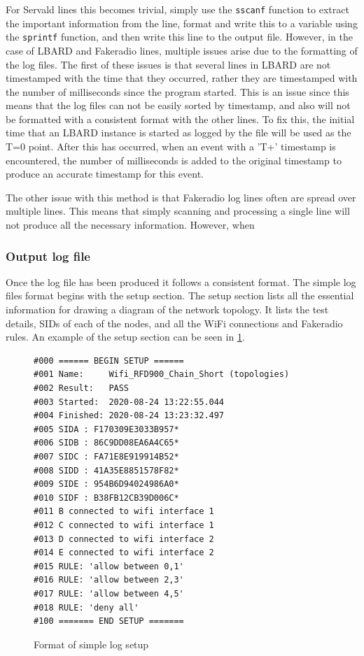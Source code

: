 For Servald lines this becomes trivial, simply use the \verb|sscanf| function to extract the important information from the line, format and write this to a variable using the \verb|sprintf| function, and then write this line to the output file. 
However, in the case of LBARD and Fakeradio lines, multiple issues arise due to the formatting of the log files.
The first of these issues is that several lines in LBARD are not timestamped with the time that they occurred, rather they are timestamped with the number of milliseconds since the program started.
This is an issue since this means that the log files can not be easily sorted by timestamp, and also will not be formatted with a consistent format with the other lines.
To fix this, the initial time that an LBARD instance is started as logged by the file will be used as the T=0 point.
After this has occurred, when an event with a 'T+' timestamp is encountered, the number of milliseconds is added to the original timestamp to produce an accurate timestamp for this event.

The other issue with this method is that Fakeradio log lines often are spread over multiple lines.
This means that simply scanning and processing a single line will not produce all the necessary information.
However, when 

\subsubsection{Output log file}

Once the log file has been produced it follows a consistent format.
The simple log files format begins with the setup section.
The setup section lists all the essential information for drawing a diagram of the network topology. 
It lists the test details, SIDs of each of the nodes, and all the WiFi connections and Fakeradio rules. 
An example of the setup section can be seen in \figurename{ \ref{fig:chapter5SimpleLogSetup}}.

\begin{figure}
    \begin{centering}
\begin{lstlisting}[frame=single]
#000 ====== BEGIN SETUP ======
#001 Name:     Wifi_RFD900_Chain_Short (topologies)
#002 Result:   PASS
#003 Started:  2020-08-24 13:22:55.044
#004 Finished: 2020-08-24 13:23:32.497
#005 SIDA : F170309E3033B957*
#006 SIDB : 86C9DD08EA6A4C65*
#007 SIDC : FA71E8E919914B52*
#008 SIDD : 41A35E8851578F82*
#009 SIDE : 954B6D94024986A0*
#010 SIDF : B38FB12CB39D006C*
#011 B connected to wifi interface 1
#012 C connected to wifi interface 1
#013 D connected to wifi interface 2
#014 E connected to wifi interface 2
#015 RULE: 'allow between 0,1'
#016 RULE: 'allow between 2,3'
#017 RULE: 'allow between 4,5'
#018 RULE: 'deny all'
#100 ======= END SETUP =======    
\end{lstlisting}
    \caption{Format of simple log setup}
    \label{fig:chapter5SimpleLogSetup}
    \end{centering}
\end{figure}

